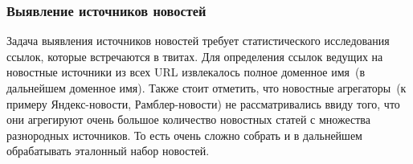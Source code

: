 %
%
%
%
%
%

    \subsubsection{Выявление источников новостей}
        Задача выявления источников новостей требует статистического исследования ссылок, которые встречаются в твитах.
        Для определения ссылок ведущих на новостные источники из всех URL извлекалось полное доменное имя~(в дальнейшем доменное имя).
        Также стоит отметить, что новостные агрегаторы~(к примеру Яндекс-новости, Рамблер-новости) не рассматривались ввиду того, что они агрегируют
        очень большое количество новостных статей с множества разнородных источников. То есть очень сложно собрать и в дальнейшем обрабатывать эталонный набор новостей.

